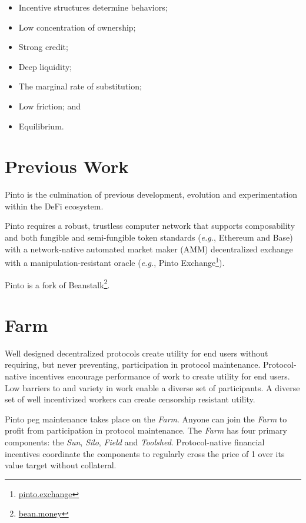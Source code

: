 \documentclass[tikz]{article}
\newcommand{\term}[1]{\textsl{#1}}
\newcommand{\fref}[1]{\footnote{\href{http://#1}{#1}}}
\newcommand{\Pinto}{} %
\begin{document}
\begin{itemize}[itemsep=0.03cm]
    \item Incentive structures determine behaviors;
    \item Low concentration of ownership;
    \item Strong credit;
    \item Deep liquidity;
    \item The marginal rate of substitution;
    \item Low friction; and
    \item Equilibrium.
\end{itemize}


\section{Previous Work}

Pinto is the culmination of previous development, evolution and experimentation within the DeFi ecosystem. 

Pinto requires a robust, trustless computer network that supports composability and both fungible and semi-fungible token standards (\term{e.g.}, Ethereum and Base) with a network-native automated market maker (AMM) decentralized exchange with a manipulation-resistant oracle (\term{e.g.}, Pinto Exchange\fref{pinto.exchange}). 

Pinto is a fork of Beanstalk\fref{bean.money}. 


\section{Farm}

Well designed decentralized protocols create utility for end users without requiring, but never preventing, participation in protocol maintenance. Protocol-native incentives encourage performance of work to create utility for end users. Low barriers to and variety in work enable a diverse set of participants. A diverse set of well incentivized workers can create censorship resistant utility. 

Pinto peg maintenance takes place on the \term{Farm}. Anyone can join the \term{Farm} to profit from participation in protocol maintenance. The \term{Farm} has four primary components: the \term{Sun}, \term{Silo}, \term{Field} and \term{Toolshed}. Protocol-native financial incentives coordinate the components to regularly cross the price of \Pinto1 over its value target without collateral.
\end{document}
